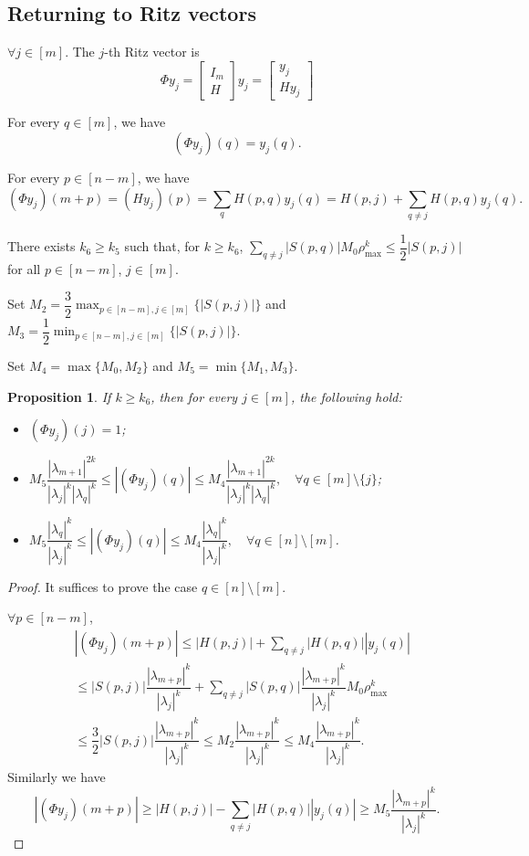 \documentclass[11pt,a4paper]{article}
\theoremstyle{plain}              %
\newtheorem{proposition}[theorem]{Proposition}
\theoremstyle{definition}         %
\begin{document}
\subsection{Returning to Ritz vectors}

\(\forall j\in[m]\). The \(j\)-th Ritz vector is
\[
\Phi y_j=\begin{bmatrix}
I_m\\
H
\end{bmatrix}y_j=\begin{bmatrix}
y_j\\
Hy_j
\end{bmatrix}
\]

For every \(q\in[m]\), we have
\[
(\Phi y_j)(q)=y_j(q).
\]

For every \(p\in[n-m]\), we have
\[
(\Phi y_j)(m+p)=(Hy_j)(p)=\sum_{q}H(p,q)y_j(q)=H(p,j)+\sum_{q\neq j}H(p,q)y_j(q).
\]

There exists \(k_6\geq k_5\) such that, for \(k\geq k_6\), \(\sum_{q\neq j}|S(p,q)|M_0\rho_{\max}^k\leq\dfrac{1}{2}|S(p,j)|\) for all \(p\in[n-m]\), \(j\in[m]\).

Set \(M_2=\dfrac{3}{2}\max_{p\in[n-m],j\in[m]}\{|S(p,j)|\}\) and \(M_3=\dfrac{1}{2}\min_{p\in[n-m],j\in[m]}\{|S(p,j)|\}\).

Set \(M_4=\max\{M_0,M_2\}\) and \(M_5=\min\{M_1,M_3\}\).

\begin{proposition}
If \(k\geq k_6\), then for every \(j\in[m]\), the following hold:
\begin{itemize}
\item \((\Phi y_j)(j)=1\);
\item \(M_5\dfrac{|\lambda_{m+1}|^{2k}}{|\lambda_j|^k|\lambda_q|^k}\leq|(\Phi y_j)(q)|\leq M_4\dfrac{|\lambda_{m+1}|^{2k}}{|\lambda_j|^k|\lambda_q|^k},\quad\forall q\in[m]\setminus\{j\}\);
\item \(M_5\dfrac{|\lambda_q|^k}{|\lambda_j|^k}\leq|(\Phi y_j)(q)|\leq M_4\dfrac{|\lambda_q|^k}{|\lambda_j|^k},\quad\forall q\in[n]\setminus[m]\).
\end{itemize}
\end{proposition}
\begin{proof}
It suffices to prove the case \(q\in[n]\setminus[m]\).

\(\forall p\in[n-m]\),
\begin{align*}
&|(\Phi y_j)(m+p)|\leq|H(p,j)|+\sum_{q\neq j}|H(p,q)||y_j(q)|\\
&\leq |S(p,j)|\dfrac{|\lambda_{m+p}|^k}{|\lambda_j|^k}+\sum_{q\neq j}|S(p,q)|\dfrac{|\lambda_{m+p}|^k}{|\lambda_j|^k}M_0\rho_{\max}^k\\
&\leq\dfrac{3}{2}|S(p,j)|\dfrac{|\lambda_{m+p}|^k}{|\lambda_j|^k}\leq M_2\dfrac{|\lambda_{m+p}|^k}{|\lambda_j|^k}\leq M_4\dfrac{|\lambda_{m+p}|^k}{|\lambda_j|^k}.
\end{align*}
Similarly we have
\[
|(\Phi y_j)(m+p)|\geq|H(p,j)|-\sum_{q\neq j}|H(p,q)||y_j(q)|\geq M_5\dfrac{|\lambda_{m+p}|^k}{|\lambda_j|^k}.
\]
\end{proof}
\end{document}
